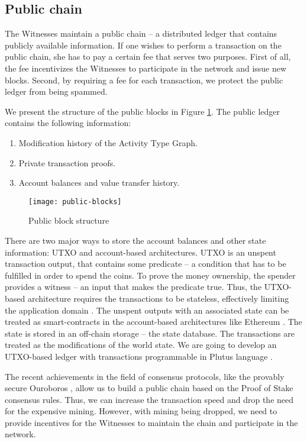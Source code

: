\subsection{Public chain}
The Witnesses maintain a public chain -- a distributed ledger that contains publicly available information. If one wishes to perform a transaction on the public chain, she has to pay a certain fee that serves two purposes. First of all, the fee incentivizes the Witnesses to participate in the network and issue new blocks. Second, by requiring a fee for each transaction, we protect the public ledger from being spammed.

We present the structure of the public blocks in Figure \ref{fig:publicblocks}. The public ledger contains the following information:
\begin{enumerate}
\item Modification history of the Activity Type Graph.
\item Private transaction proofs.
\item Account balances and value transfer history.
\end{enumerate}

\begin{figure}[ht]
\centering
\texttt{[image: public-blocks]}
\caption{Public block structure}
\label{fig:publicblocks}
\end{figure}

There are two major ways to store the account balances and other state information: UTXO and account-based architectures. UTXO is an unspent transaction output, that contains some predicate -- a condition that has to be fulfilled in order to spend the coins. To prove the money ownership, the spender provides a witness -- an input that makes the predicate true. Thus, the UTXO-based architecture requires the transactions to be stateless, effectively limiting the application domain \cite{bentov2017instantaneous}.  The unspent outputs with an associated state can be treated as smart-contracts in the account-based architectures like Ethereum \cite{wood2014ethereum}. The state is stored in an off-chain storage -- the state database. The transactions are treated as the modifications of the world state. We are going to develop an UTXO-based ledger with transactions programmable in Plutus language \cite{Plutus}.

The recent achievements in the field of consensus protocols, like the provably secure Ouroboros \cite{kiayias2017ouroboros}, allow us to build a public chain based on the Proof of Stake consensus rules. Thus, we can increase the transaction speed and drop the need for the expensive mining. However, with mining being dropped, we need to provide incentives for the Witnesses to maintain the chain and participate in the network.

